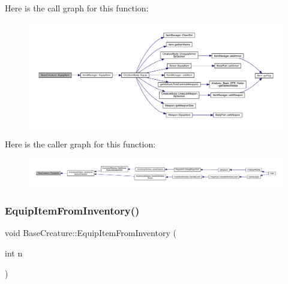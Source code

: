 Here is the call graph for this function\+:
\nopagebreak
\begin{figure}[H]
\begin{center}
\leavevmode
\includegraphics[width=350pt]{d2/d3b/class_base_creature_a1e73375251b20070ae9dac505b280b3e_cgraph}
\end{center}
\end{figure}
Here is the caller graph for this function\+:
\nopagebreak
\begin{figure}[H]
\begin{center}
\leavevmode
\includegraphics[width=350pt]{d2/d3b/class_base_creature_a1e73375251b20070ae9dac505b280b3e_icgraph}
\end{center}
\end{figure}
\mbox{\label{class_base_creature_a637cb7174d9bb9677a21281ff19fb10a}} 
\subsubsection{\texorpdfstring{Equip\+Item\+From\+Inventory()}{EquipItemFromInventory()}}
{\footnotesize\ttfamily void Base\+Creature\+::\+Equip\+Item\+From\+Inventory (\begin{DoxyParamCaption}\item[{int}]{n }\end{DoxyParamCaption})}

\mbox{\label{class_base_creature_ac04efe1dda147e264998609635baadb6}} 
